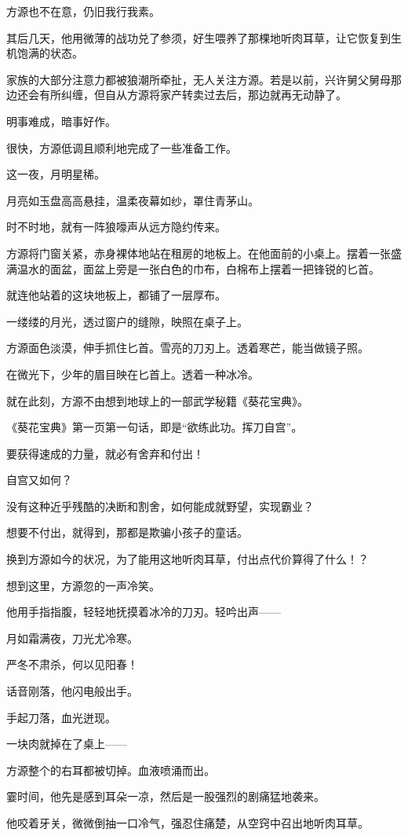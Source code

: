 \begin{this_body}
方源也不在意，仍旧我行我素。

其后几天，他用微薄的战功兑了参须，好生喂养了那棵地听肉耳草，让它恢复到生机饱满的状态。

家族的大部分注意力都被狼潮所牵扯，无人关注方源。若是以前，兴许舅父舅母那边还会有所纠缠，但自从方源将家产转卖过去后，那边就再无动静了。

明事难成，暗事好作。

很快，方源低调且顺利地完成了一些准备工作。

这一夜，月明星稀。

月亮如玉盘高高悬挂，温柔夜幕如纱，罩住青茅山。

时不时地，就有一阵狼嚎声从远方隐约传来。

方源将门窗关紧，赤身裸体地站在租房的地板上。在他面前的小桌上。摆着一张盛满温水的面盆，面盆上旁是一张白色的巾布，白棉布上摆着一把锋锐的匕首。

就连他站着的这块地板上，都铺了一层厚布。

一缕缕的月光，透过窗户的缝隙，映照在桌子上。

方源面色淡漠，伸手抓住匕首。雪亮的刀刃上。透着寒芒，能当做镜子照。

在微光下，少年的眉目映在匕首上。透着一种冰冷。

就在此刻，方源不由想到地球上的一部武学秘籍《葵花宝典》。

《葵花宝典》第一页第一句话，即是“欲练此功。挥刀自宫”。

要获得速成的力量，就必有舍弃和付出！

自宫又如何？

没有这种近乎残酷的决断和割舍，如何能成就野望，实现霸业？

想要不付出，就得到，那都是欺骗小孩子的童话。

换到方源如今的状况，为了能用这地听肉耳草，付出点代价算得了什么！？

想到这里，方源忽的一声冷笑。

他用手指指腹，轻轻地抚摸着冰冷的刀刃。轻吟出声——

月如霜满夜，刀光尤冷寒。

严冬不肃杀，何以见阳春！

话音刚落，他闪电般出手。

手起刀落，血光迸现。

一块肉就掉在了桌上——

方源整个的右耳都被切掉。血液喷涌而出。

霎时间，他先是感到耳朵一凉，然后是一股强烈的剧痛猛地袭来。

他咬着牙关，微微倒抽一口冷气，强忍住痛楚，从空窍中召出地听肉耳草。


\end{this_body}
